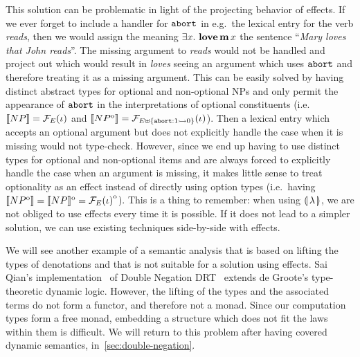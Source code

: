 This solution can be problematic in light of the projecting behavior of
effects. If we ever forget to include a handler for $\mathtt{abort}$ in e.g.\
the lexical entry for the verb \emph{reads}, then we would assign the
meaning $\exists x.\ \textbf{love}\,\textbf{m}\,x$ the sentence
``\emph{Mary loves that John reads}''. The missing argument to \emph{reads}
would not be handled and project out which would result in \emph{loves}
seeing an argument which uses $\mathtt{abort}$ and therefore treating it as a
missing argument. This can be easily solved by having distinct abstract
types for optional and non-optional NPs and only permit the appearance of
$\mathtt{abort}$ in the interpretations of optional constituents (i.e.\
$\llbracket NP \rrbracket = \mathcal{F}_E(\iota)$ and
$\llbracket NP^{\mathrm{o}} \rrbracket = \mathcal{F}_{E \uplus \{\mathtt{abort} : 1 \rightarrowtail 0\}}(\iota)$). Then
a lexical entry which accepts an optional argument but does not explicitly
handle the case when it is missing would not type-check. However, since we
end up having to use distinct types for optional and non-optional items and
are always forced to explicitly handle the case when an argument is
missing, it makes little sense to treat optionality as an effect instead of
directly using option types (i.e.\ having
$\llbracket NP^{\mathrm{o}} \rrbracket = \llbracket NP \rrbracket^{\mathrm{o}} = {\mathcal{F}_E(\iota)}^{\mathrm{o}}$). This is a
thing to remember: when using $\llparenthesis \, \lambda \, \rrparenthesis$, we are not obliged to use
effects every time it is possible. If it does not lead to a simpler
solution, we can use existing techniques side-by-side with effects.

We will see another example of a semantic analysis that is based on lifting
the types of denotations and that is not suitable for a solution using
effects. Sai Qian's implementation~\cite{qian2014accessibility} of Double
Negation DRT~\cite{krahmer1995negation} extends de Groote's type-theoretic
dynamic logic. However, the lifting of the types and the associated terms
do not form a functor, and therefore not a monad. Since our computation
types form a free monad, embedding a structure which does not fit the laws
within them is difficult. We will return to this problem after having
covered dynamic semantics, in~\ref{sec:double-negation}.


